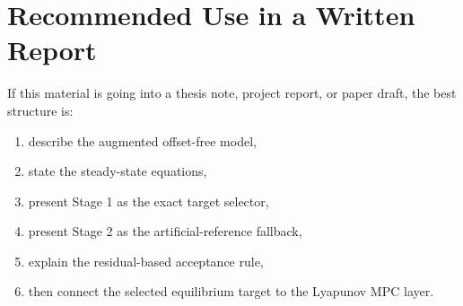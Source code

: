 \documentclass[11pt]{article}
\begin{document}
\section{Recommended Use in a Written Report}
If this material is going into a thesis note, project report, or paper draft, the
best structure is:
\begin{enumerate}
    \item describe the augmented offset-free model,
    \item state the steady-state equations,
    \item present Stage 1 as the exact target selector,
    \item present Stage 2 as the artificial-reference fallback,
    \item explain the residual-based acceptance rule,
    \item then connect the selected equilibrium target to the Lyapunov MPC layer.
\end{enumerate}
\end{document}
